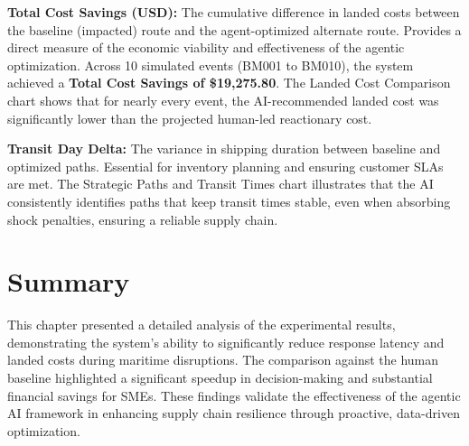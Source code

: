 \textbf{Total Cost Savings (USD):} The cumulative difference in landed costs between the baseline (impacted) route and the agent-optimized alternate route. Provides a direct measure of the economic viability and effectiveness of the agentic optimization. Across 10 simulated events (BM001 to BM010), the system achieved a \textbf{Total Cost Savings of \$19,275.80}. The Landed Cost Comparison chart shows that for nearly every event, the AI-recommended landed cost was significantly lower than the projected human-led reactionary cost.

\textbf{Transit Day Delta:} The variance in shipping duration between baseline and optimized paths. Essential for inventory planning and ensuring customer SLAs are met. The Strategic Paths and Transit Times chart illustrates that the AI consistently identifies paths that keep transit times stable, even when absorbing shock penalties, ensuring a reliable supply chain.

\section[Summary]{Summary}
This chapter presented a detailed analysis of the experimental results, demonstrating the system's ability to significantly reduce response latency and landed costs during maritime disruptions. The comparison against the human baseline highlighted a significant speedup in decision-making and substantial financial savings for SMEs. These findings validate the effectiveness of the agentic AI framework in enhancing supply chain resilience through proactive, data-driven optimization.
